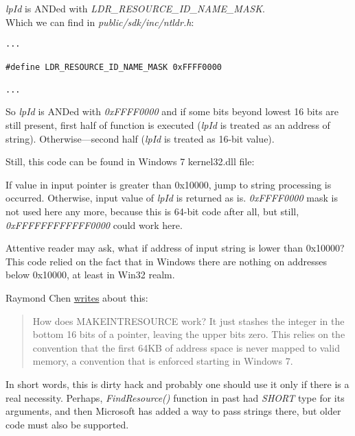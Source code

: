 \emph{lpId} is ANDed with \emph{LDR\_RESOURCE\_ID\_NAME\_MASK}. \\
Which we can find in \emph{public/sdk/inc/ntldr.h}:

\begin{lstlisting}[style=customc]
...

#define LDR_RESOURCE_ID_NAME_MASK 0xFFFF0000

...
\end{lstlisting}

So \emph{lpId} is ANDed with \emph{0xFFFF0000} and if some bits beyond lowest 16 bits are still present,
first half of function is executed (\emph{lpId} is treated as an address of string).
Otherwise---second half (\emph{lpId} is treated as 16-bit value).

Still, this code can be found in Windows 7 kernel32.dll file:



If value in input pointer is greater than 0x10000, jump to string processing is occurred.
Otherwise, input value of \emph{lpId} is returned as is.
\emph{0xFFFF0000} mask is not used here any more, because this is 64-bit code after all, but still, \emph{0xFFFFFFFFFFFF0000} could work here.

Attentive reader may ask, what if address of input string is lower than 0x10000?
This code relied on the fact that in Windows there are nothing on addresses below 0x10000, at least in Win32 realm.

Raymond Chen \href{https://blogs.msdn.microsoft.com/oldnewthing/20130925-00/?p=3123}{writes} about this:

\begin{framed}
\begin{quotation}
How does MAKE­INT­RESOURCE work? It just stashes the integer in the bottom 16 bits of a pointer, leaving the upper bits zero. This relies on the convention that the first 64KB of address space is never mapped to valid memory, a convention that is enforced starting in Windows 7.
\end{quotation}
\end{framed}

In short words, this is dirty hack and probably one should use it only if there is a real necessity.
Perhaps, \emph{FindResource()} function in past had \emph{SHORT} type for its arguments, and then Microsoft has added a way to pass strings there,
but older code must also be supported.

